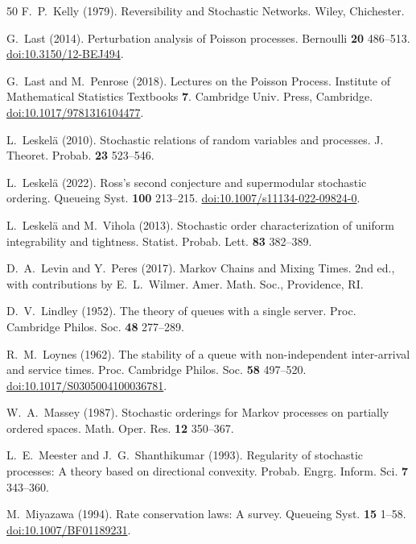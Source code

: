 \documentclass[aap,preprint]{imsart}
\numberwithin{equation}{section}
\theoremstyle{plain}
\theoremstyle{definition}
\newcommand{\1}{\mathbf 1}
\begin{document}
\begin{thebibliography}{50}
F.~P.~Kelly (1979).
Reversibility and Stochastic Networks.
Wiley, Chichester.

G.~Last (2014).
Perturbation analysis of Poisson processes.
Bernoulli \textbf{20} 486--513.
\href{https://doi.org/10.3150/12-BEJ494}{doi:10.3150/12-BEJ494}.

G.~Last and M.~Penrose (2018).
Lectures on the Poisson Process.
Institute of Mathematical Statistics Textbooks \textbf{7}. Cambridge Univ. Press, Cambridge.
\href{https://doi.org/10.1017/9781316104477}{doi:10.1017/9781316104477}.

L.~Leskel\"a (2010).
Stochastic relations of random variables and processes.
J. Theoret. Probab. \textbf{23} 523--546.

L.~Leskel\"a (2022).
Ross's second conjecture and supermodular stochastic ordering.
Queueing Syst. \textbf{100} 213--215.
\href{https://doi.org/10.1007/s11134-022-09824-0}{doi:10.1007/s11134-022-09824-0}.

L.~Leskel\"a and M.~Vihola (2013).
Stochastic order characterization of uniform integrability and tightness.
Statist. Probab. Lett. \textbf{83} 382--389.

D.~A.~Levin and Y.~Peres (2017).
Markov Chains and Mixing Times.
2nd ed., with contributions by E.~L.~Wilmer. Amer. Math. Soc., Providence, RI.

D.~V.~Lindley (1952).
The theory of queues with a single server.
Proc. Cambridge Philos. Soc. \textbf{48} 277--289.

R.~M.~Loynes (1962).
The stability of a queue with non-independent inter-arrival and service times.
Proc. Cambridge Philos. Soc. \textbf{58} 497--520.
\href{https://doi.org/10.1017/S0305004100036781}{doi:10.1017/S0305004100036781}.

W.~A.~Massey (1987).
Stochastic orderings for Markov processes on partially ordered spaces.
Math. Oper. Res. \textbf{12} 350--367.

L.~E.~Meester and J.~G.~Shanthikumar (1993).
Regularity of stochastic processes: A theory based on directional convexity.
Probab. Engrg. Inform. Sci. \textbf{7} 343--360.

M.~Miyazawa (1994).
Rate conservation laws: A survey.
Queueing Syst. \textbf{15} 1--58.
\href{https://doi.org/10.1007/BF01189231}{doi:10.1007/BF01189231}.


\end{thebibliography}
\end{document}
